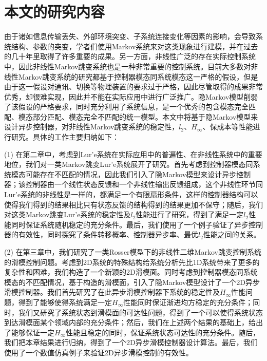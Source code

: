 \section{本文的研究内容}
	由于诸如信息传输丢失、外部环境突变、子系统连接变化等因素的影响，会导致系统结构、参数的突变，学者们使用Markov系统来对这类现象进行建模，并在过去的几十年里取得了许多重要的成果。另一方面，非线性广泛的存在实际控制系统中，因此非线性Markov跳变系统也是一种非常重要的控制系统。目前大多数对非线性Markov跳变系统的研究都基于控制器模态同系统模态这一严格的假设，但是由于这一假设对通讯、切换等物理装置的要求过于严格，因此尽管取得的成果非常优秀，却很难实现，因此并不能在实际应用中进行广泛推广。隐Markov模型削弱了该假设的严格要求，同时充分利用了系统信息，是一个优秀的包含模态完全匹配、模态部分匹配、模态完全不匹配的统一模型。本文中将基于隐Markov模型来设计异步控制器，对非线性Markov跳变系统的稳定性，$l_2$、$H_\infty$、保成本等性能进行研究。具体的工作主要归纳如下：
	
	(1) 在第二章中，考虑到Lur'e系统在实际应用中的普遍性、在非线性系统中的重要地位，我们对一类Markov跳变Lur'e系统展开了研究。首先考虑到控制器模态同系统模态可能存在不匹配的情况，因此我们引入了隐Markov模型来设计异步控制器；该控制器由一个线性状态反馈和一个非线性输出反馈组成，这个非线性环节同Lur'e系统的非线性是一样的，都满足一个有限扇形条件，这样的控制器结构可以使得我们得到的结果相比只有状态反馈的结构得到的结果更加不保守；随后，我们对这类Markov跳变Lur'e系统的稳定性及$l_2$性能进行了研究，得到了满足一定$l_2$性能同时保证系统随机稳定的充分条件。最后，我们使用了一个例子验证了异步控制器的有效性，同时探究了条件转移概率、控制器异步率、最优$l_2$性能之间的关系。
	
	(2) 在第三章中，我们研究了一类Rosser模型下的非线性二维Markov跳变控制系统的滑模控制问题。考虑到2D系统的特殊结构给系统分析先比1D系统带来了更多的复杂性和困难，我们构造了一个新颖的2D滑模面。同时考虑到控制器模态同系统模态的不匹配情况，基于构造的滑模面，引入了隐Markov模型设计了一个2D异步滑模控制器。我们首先研究了在此异步滑模控制器下系统的稳定性及$H_\infty$性能问题，得到了能够使得系统满足一定$H_\infty$性能同时保证渐进均方稳定的充分条件；同时，我们又研究了系统状态到滑模面的可达性问题，得到了一个可以使得系统状态到达滑模面某个领域内部的充分条件；然后，我们在上述两个结果的基础上，给出了能够保证一定$H_\infty$性能且稳定的同时，保证系统状态可达性的充分条件。随后，我们把本章结果进行归纳，得到了一个2D异步滑模控制器设计算法。最后，我们使用了一个数值仿真例子来验证2D异步滑模控制的有效性。
	
